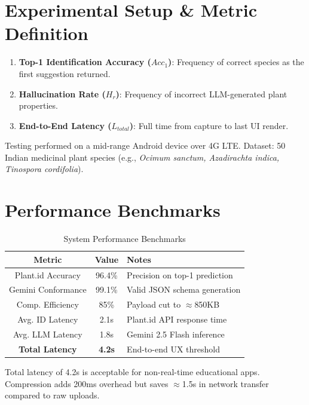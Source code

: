 \newpage
\section{Experimental Setup \& Metric Definition}
\begin{enumerate}[itemsep=2pt, topsep=4pt]
    \item \textbf{Top-1 Identification Accuracy ($Acc_1$)}: Frequency of correct species
    as the first suggestion returned.
    \item \textbf{Hallucination Rate ($H_r$)}: Frequency of incorrect LLM-generated plant
    properties.
    \item \textbf{End-to-End Latency ($L_{total}$)}: Full time from capture to last UI
    render.
\end{enumerate}
Testing performed on a mid-range Android device over 4G LTE. Dataset: 50 Indian medicinal
plant species (e.g., \textit{Ocimum sanctum, Azadirachta indica, Tinospora cordifolia}).

\vspace{-8pt}
\section{Performance Benchmarks}
\setcounter{table}{2}
\begin{table}[H]
\caption{System Performance Benchmarks}
\begin{center}
\begin{tabular}{|c|c|l|}
\hline
\textbf{Metric} & \textbf{Value} & \textbf{Notes} \\
\hline
Plant.id Accuracy & 96.4\% & Precision on top-1 prediction \\
\hline
Gemini Conformance & 99.1\% & Valid JSON schema generation \\
\hline
Comp. Efficiency & 85\% & Payload cut to $\approx$850KB \\
\hline
Avg. ID Latency & 2.1s & Plant.id API response time \\
\hline
Avg. LLM Latency & 1.8s & Gemini 2.5 Flash inference \\
\hline
\textbf{Total Latency} & \textbf{4.2s} & End-to-end UX threshold \\
\hline
\end{tabular}
\end{center}
\end{table}
\vspace{-12pt}

Total latency of 4.2s is acceptable for non-real-time educational apps. Compression adds
200ms overhead but saves $\approx$1.5s in network transfer compared to raw uploads.

